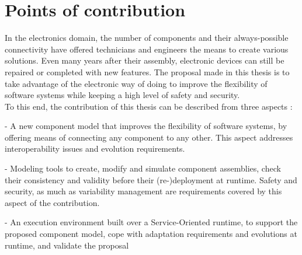 \section{Points of contribution}

In the electronics domain, the number of components and their always-possible connectivity have offered technicians and engineers the means to create various solutions. Even many years after their assembly, electronic devices can still be repaired or completed with new features. The proposal made in this thesis is to take advantage of the electronic way of doing to improve the flexibility of software systems while keeping a high level of safety and security.\\
To this end, the contribution of this thesis can be described from three aspects :
\par - A new component model that improves the flexibility of software systems, by offering means of connecting any component to any other. This aspect addresses interoperability issues and evolution requirements.
\par - Modeling tools to create, modify and simulate component assemblies, check their consistency and validity before their (re-)deployment at runtime. Safety and security, as much as variability management are requirements covered by this aspect of the contribution.
\par - An execution environment built over a Service-Oriented runtime, to support the proposed component model, cope with adaptation requirements and evolutions at runtime, and validate the proposal\\

